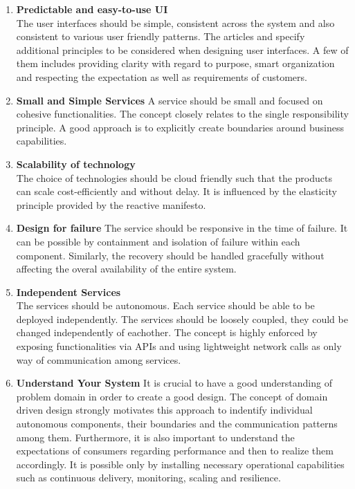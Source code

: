 \begin{enumerate}
\item \textbf{Predictable and easy-to-use UI}\\
The user interfaces should be simple, consistent across the system and also consistent to various user friendly patterns.\cite{Sollenberger:2012aa} The articles \cite{Martin:2013aa} and \cite{Porter:2016aa} specify additional principles to be considered when designing user interfaces. A few of them includes providing clarity with regard to purpose, smart organization and respecting the expectation as well as requirements of customers.
\item \textbf{Small and Simple Services}
A service should be small and focused on cohesive functionalities. The concept closely relates to the single responsibility principle. \cite{Martin:2016aa} A good approach is to explicitly create boundaries around business capabilities.\cite{Newman:2015aa}
\item \textbf{Scalability of technology}\\
The choice of technologies should be cloud friendly such that the products can scale cost-efficiently and without delay. It is influenced by the elasticity principle provided by the reactive manifesto.\cite{Boner:2014aa}
\item \textbf{Design for failure}
The service should be responsive in the time of failure. It can be possible by containment and isolation of failure within each component. Similarly, the recovery should be handled gracefully without affecting the overal availability of the entire system. \cite{Boner:2014aa}
\item \textbf{Independent Services}\\
The services should be autonomous. Each service should be able to be deployed independently. The services should be loosely coupled, they could be changed independently of eachother. The concept is highly enforced by exposing functionalities via \acrshort{API}s and using lightweight network calls as only way of communication among services. \cite{Newman:2015aa}
\item \textbf{Understand Your System}
It is crucial to have a good understanding of problem domain in order to create a good design. The concept of domain driven design strongly motivates this approach to indentify individual autonomous components, their boundaries and the communication patterns among them. \cite{Newman:2015aa} Furthermore, it is also important to understand the expectations of consumers regarding performance and then to realize them accordingly. It is possible only by installing necessary operational capabilities such as continuous delivery, monitoring, scaling and resilience.
\end{enumerate}

